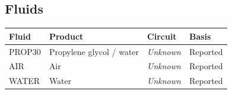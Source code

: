 \documentclass[11pt]{article}
\begin{document}
\subsection*{Fluids}
\small\setlength{\tabcolsep}{4pt}
\begin{longtable}{>{\raggedright\arraybackslash}p{}>{\raggedright\arraybackslash}p{}>{\raggedright\arraybackslash}p{}>{\raggedright\arraybackslash}p{}}
\toprule
\textbf{Fluid} & \textbf{Product} & \textbf{Circuit} & \textbf{Basis} \\\midrule\endhead
PROP30 & Propylene glycol / water & \textit{Unknown} & Reported \\[3pt]
AIR & Air & \textit{Unknown} & Reported \\[3pt]
WATER & Water & \textit{Unknown} & Reported \\[3pt]
\bottomrule\end{longtable}\normalsize
\end{document}
